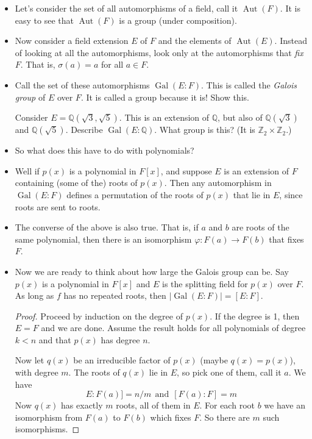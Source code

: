 \documentclass[12pt]{article}
\theoremstyle{plain}
\theoremstyle{definition}
\theoremstyle{remark}
\newcommand{\ex}{\noindent{\bf Ex: }}
\def\Z{\mathbb Z}
\def\Q{\mathbb Q}
\DeclareMathOperator{\Aut}{Aut}
\DeclareMathOperator{\Gal}{Gal}
\begin{document}
\begin{itemize}
\item Let's consider the set of all automorphisms of a field, call it $\Aut(F)$.  It is easy to see that $\Aut(F)$ is a group (under composition).
\item Now consider a field extension $E$ of $F$ and the elements of $\Aut(E)$.  Instead of looking at all the automorphisms, look only at the automorphisms that {\em fix} $F$.  That is, $\sigma(a) = a$ for all $a \in F$.
\item Call the set of these automorphisms $\Gal(E:F)$.  This is called the {\em Galois group} of $E$ over $F$.  It is called a group because it is!  Show this.

\ex Consider $E = \Q(\sqrt{3}, \sqrt{5})$.  This is an extension of $\Q$, but also of $\Q(\sqrt{3})$ and $\Q(\sqrt{5})$.  Describe $\Gal(E:\Q)$.  What group is this?  (It is $\Z_2 \times \Z_2$.)

\item So what does this have to do with polynomials?  

\item Well if $p(x)$ is a polynomial in $F[x]$, and suppose $E$ is an extension of $F$ containing (some of the) roots of $p(x)$.  Then any automorphism in $\Gal(E:F)$ defines a permutation of the roots of $p(x)$ that lie in $E$, since roots are sent to roots.


\item The converse of the above is also true.  That is, if $a$ and $b$ are roots of the same polynomial, then there is an isomorphism $\varphi:F(a) \to F(b)$ that fixes $F$.
 
\item Now we are ready to think about how large the Galois group can be.  Say $p(x)$ is a polynomial in $F[x]$ and $E$ is the splitting field for $p(x)$ over $F$.  As long as $f$ has no repeated roots, then $|\Gal(E:F)| = [E:F]$.

\begin{proof}
Proceed by induction on the degree of $p(x)$.  If the degree is 1, then $E = F$ and we are done.  Assume the result holds for all polynomials of degree $k < n$ and that $p(x)$ has degree $n$. 

Now let $q(x)$ be an irreducible factor of $p(x)$ (maybe $q(x) = p(x)$), with degree $m$.  The roots of $q(x)$ lie in $E$, so pick one of them, call it $a$.  We have
\[E:F(a)] = n/m ~~\mbox{and}~~[F(a):F] = m\]
Now $q(x)$ has exactly $m$ roots, all of them in $E$.  For each root $b$ we have an isomorphism from $F(a)$ to $F(b)$ which fixes $F$.  So there are $m$ such isomorphisms.  


\end{proof}
\end{itemize}
\end{document}
